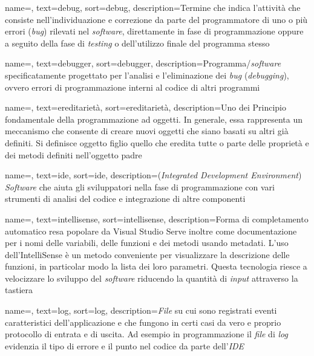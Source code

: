 {
    name=,
    text=debug,
    sort=debug,
    description={Termine che indica l’attività che
    consiste nell’individuazione e correzione da parte del programmatore di uno o più
    errori (\textit{bug}) rilevati nel \textit{software}, direttamente in fase di programmazione oppure
    a seguito della fase di \textit{testing} o dell’utilizzo finale del programma stesso}
}

{
    name=,
    text=debugger,
    sort=debugger,
    description={Programma/\textit{software} specificatamente
    progettato per l’analisi e l’eliminazione dei \textit{bug} (\textit{debugging}), ovvero errori di
    programmazione interni al codice di altri programmi}
}

{
    name=,
    text=ereditarietà,
    sort=ereditarietà,
    description={Uno dei Principio fondamentale della programmazione ad oggetti. In
    generale, essa rappresenta un meccanismo che consente di creare nuovi oggetti
    che siano basati su altri già definiti. Si definisce oggetto figlio 
    quello che eredita tutte o parte delle proprietà e dei metodi definiti nell’oggetto
    padre}
}

{
    name=,
    text=ide,
    sort=ide,
    description={(\textit{Integrated Development Environment})
    \textit{Software} che aiuta gli sviluppatori nella fase di programmazione con vari strumenti
    di analisi del codice e integrazione di altre componenti}
}

{
    name=,
    text=intellisense,
    sort=intellisense,
    description={Forma di completamento automatico resa popolare da Visual Studio
    Serve inoltre come documentazione per i
    nomi delle variabili, delle funzioni e dei metodi usando metadati. L’uso
    dell’IntelliSense è un metodo conveniente per visualizzare la descrizione delle
    funzioni, in particolar modo la lista dei loro parametri. Questa tecnologia riesce
    a velocizzare lo sviluppo del \textit{software} riducendo la quantità di \textit{input} attraverso
    la tastiera}
}

{
    name=,
    text=log,
    sort=log,
    description={\textit{File} su cui sono registrati eventi caratteristici dell’applicazione e che fungono
    in certi casi da vero e proprio protocollo di entrata e di uscita. Ad esempio in
    programmazione il \textit{file} di \textit{log} evidenzia il tipo di errore e il punto nel codice
    da parte dell’\textit{IDE}}
}

